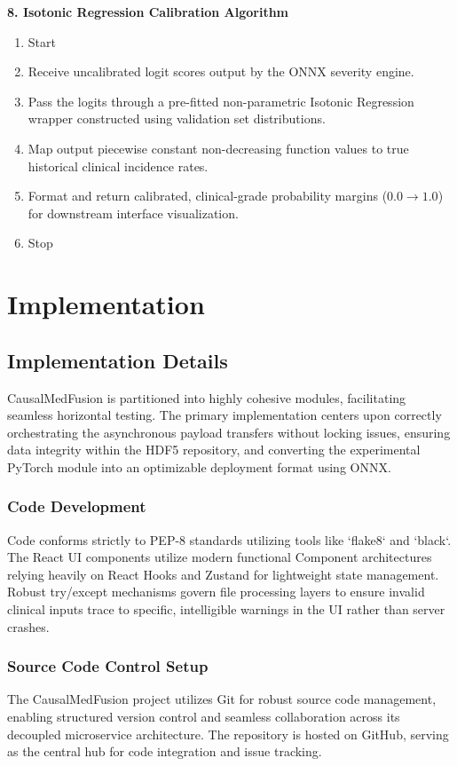 \documentclass{fisatprojectfinal}
\begin{document}
\textbf{8. Isotonic Regression Calibration Algorithm}
\begin{enumerate}
    \item Start
    \item Receive uncalibrated logit scores output by the ONNX severity engine.
    \item Pass the logits through a pre-fitted non-parametric Isotonic Regression wrapper constructed using validation set distributions.
    \item Map output piecewise constant non-decreasing function values to true historical clinical incidence rates.
    \item Format and return calibrated, clinical-grade probability margins ($0.0 \rightarrow 1.0$) for downstream interface visualization.
    \item Stop
\end{enumerate}

\chapter{Implementation}
\section{Implementation Details}
CausalMedFusion is partitioned into highly cohesive modules, facilitating seamless horizontal testing. The primary implementation centers upon correctly orchestrating the asynchronous payload transfers without locking issues, ensuring data integrity within the HDF5 repository, and converting the experimental PyTorch module into an optimizable deployment format using ONNX.

\subsection{Code Development}
Code conforms strictly to PEP-8 standards utilizing tools like `flake8` and `black`. The React UI components utilize modern functional Component architectures relying heavily on React Hooks and Zustand for lightweight state management. Robust try/except mechanisms govern file processing layers to ensure invalid clinical inputs trace to specific, intelligible warnings in the UI rather than server crashes.

\subsection{Source Code Control Setup}
The CausalMedFusion project utilizes Git for robust source code management, enabling structured version control and seamless collaboration across its decoupled microservice architecture. The repository is hosted on GitHub, serving as the central hub for code integration and issue tracking.
\end{document}
